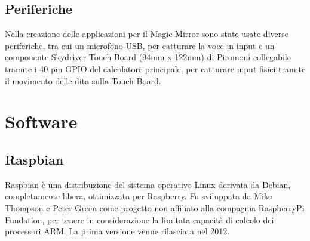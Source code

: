 \subsection{Periferiche}
Nella creazione delle applicazioni per il Magic Mirror sono state usate diverse periferiche, tra cui un microfono
USB, per catturare la voce in input e un componente Skydriver Touch Board (94mm x 122mm) di Piromoni collegabile tramite
i 40 pin GPIO del calcolatore principale, per catturare input fisici tramite il movimento delle dita sulla Touch Board.

\section{Software}
\subsection{Raspbian}
Raspbian \`e una distribuzione del sistema operativo Linux derivata da Debian, completamente libera,
ottimizzata per Raspberry.
Fu sviluppata da Mike Thompson e Peter Green come progetto non affiliato alla compagnia RaspberryPi
Fundation, per tenere in considerazione la limitata capacità di calcolo dei processori ARM.
La prima versione venne rilasciata nel 2012.


